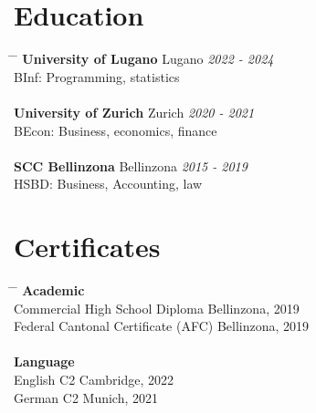 \documentclass[a4paper,11pt]{article}  %
\begin{document}
\begin{comment}
\begin{tabbing}
\hspace{3.5in} \= \hspace{2in} \= \kill
\textbf{Lauzon} \> Dallas, TX \> \textit{2013 - 2016} \\
\textbf{Business Analyst} \> \\
\end{tabbing}
\begin{itemize}[leftmargin=*]
    \item Prepared 2016 Budget with Variance analysis to prior years.
    \item Assisted merger in advanced electronics space, identifying synergy opportunities of \$60M.
    \item Reduced IPS (Customer Issues) by 2.2\% while impacting merely 3\% of GMV.
    \item Designed and maintained 10+ data integration jobs.
\end{itemize}

\vspace{0.2in}
\end{comment}

\section*{Education}
\begin{tabbing}
\hspace{3.5in} \= \hspace{2in} \= \kill
\textbf{University of Lugano} \> Lugano \> \textit{2022 - 2024} \\
BInf: Programming, statistics \> \\
\\
\textbf{University of Zurich} \> Zurich \> \textit{2020 - 2021} \\
BEcon: Business, economics, finance \> \\\
\\
\textbf{SCC Bellinzona} \> Bellinzona \> \textit{2015 - 2019} \\
HSBD: Business, Accounting, law \> \\
\end{tabbing}


\section*{Certificates}
\begin{tabbing}
\hspace{3.5in} \= \hspace{2in} \= \kill
\textbf{Academic} \\
Commercial High School Diploma \> Bellinzona, 2019 \\
Federal Cantonal Certificate (AFC) \> Bellinzona, 2019 \\
\\
\textbf{Language} \\
English C2 \> Cambridge, 2022 \\
German C2 \> Munich, 2021 \\
\end{tabbing}
\end{document}
